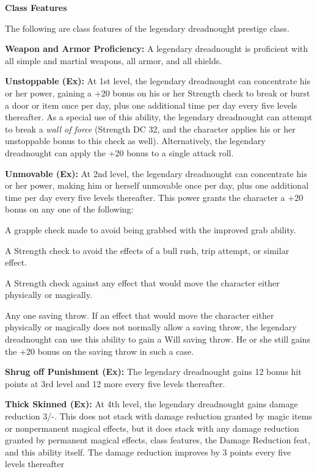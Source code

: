 \documentclass{article}
\begin{document}
\vspace{12pt}
\textbf{Class Features}

The following are class features of the legendary dreadnought prestige class. 

\textbf{Weapon and Armor Proficiency:} A legendary dreadnought is proficient with 
all simple and martial weapons, all armor, and all shields. 

\textbf{Unstoppable (Ex):} At 1st level, the legendary dreadnought can concentrate 
his or her power, gaining a +20 bonus on his or her Strength check to break or 
burst a door or item once per day, plus one additional time per day every five 
levels thereafter. As a special use of this ability, the legendary dreadnought 
can attempt to break a \textit{wall of force }(Strength DC 32, and the character 
applies his or her unstoppable bonus to this check as well). Alternatively, the 
legendary dreadnought can apply the +20 bonus to a single attack roll. 

\textbf{Unmovable (Ex):} At 2nd level, the legendary dreadnought can concentrate 
his or her power, making him or herself unmovable once per day, plus one additional 
time per day every five levels thereafter.  This power grants the character a +20 
bonus on any one of the following: 

A grapple check made to avoid being grabbed with the improved grab ability. 

A Strength check to avoid the effects of a bull rush, trip attempt, or similar 
effect. 

A Strength check against any effect that would move the character either physically 
or magically. 

Any one saving throw. If an effect that would move the character either physically 
or magically does not normally allow a saving throw, the legendary dreadnought 
can use this ability to gain a Will saving throw. He or she still gains the +20 
bonus on the saving throw in such a case.  

\textbf{Shrug off Punishment (Ex):} The legendary dreadnought gains 12 bonus hit 
points at 3rd level and 12 more every five levels thereafter. 

\textbf{Thick Skinned (Ex):} At 4th level, the legendary dreadnought gains damage 
reduction 3/-. This does not stack with damage reduction granted by magic items 
or nonpermanent magical effects, but it does stack with any damage reduction granted 
by permanent magical effects, class features, the Damage Reduction feat, and this 
ability itself. The damage reduction improves by 3 points every five levels thereafter
\end{document}
